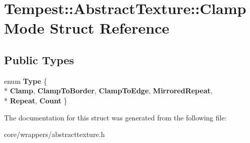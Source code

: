 \hypertarget{struct_tempest_1_1_abstract_texture_1_1_clamp_mode}{\section{Tempest\+:\+:Abstract\+Texture\+:\+:Clamp\+Mode Struct Reference}
\label{struct_tempest_1_1_abstract_texture_1_1_clamp_mode}
}
\subsection*{Public Types}
\begin{DoxyCompactItemize}
\item 
\hypertarget{struct_tempest_1_1_abstract_texture_1_1_clamp_mode_a48849804d7d26fa1588769fca3128b17}{enum {\bfseries Type} \{ \\*
{\bfseries Clamp}, 
{\bfseries Clamp\+To\+Border}, 
{\bfseries Clamp\+To\+Edge}, 
{\bfseries Mirrored\+Repeat}, 
\\*
{\bfseries Repeat}, 
{\bfseries Count}
 \}}\label{struct_tempest_1_1_abstract_texture_1_1_clamp_mode_a48849804d7d26fa1588769fca3128b17}

\end{DoxyCompactItemize}


The documentation for this struct was generated from the following file\+:\begin{DoxyCompactItemize}
\item 
core/wrappers/abstracttexture.\+h\end{DoxyCompactItemize}
